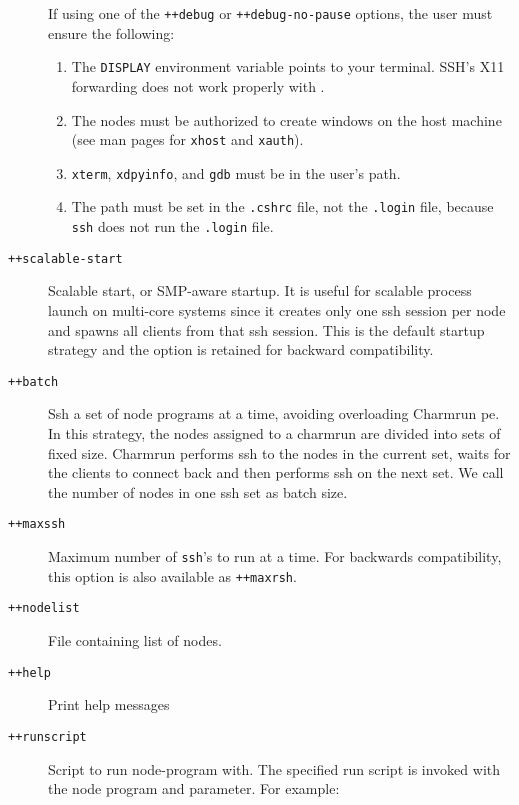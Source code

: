 \begin{description}
If using one of the {\tt ++debug} or {\tt ++debug-no-pause} options,
the user must ensure the following:
\begin{enumerate}

\item The {\tt DISPLAY} environment variable points to your terminal.
SSH's X11 forwarding does not work properly with \charmpp{}.

\item The nodes must be authorized to create windows on the host machine (see
man pages for {\tt xhost} and {\tt xauth}).

\item {\tt xterm}, {\tt xdpyinfo},  and {\tt gdb} must be in
the user's path.

\item The path must be set in the {\tt .cshrc} file, not the {\tt .login}
file, because {\tt ssh} does not run the {\tt .login} file.

\end{enumerate}

\item[{\tt ++scalable-start}]   Scalable start, or SMP-aware startup. It is useful for scalable process launch on multi-core systems since it creates only one ssh session per node and spawns all clients from that ssh session. This is the default startup strategy and the option is retained for backward compatibility.

\item[{\tt ++batch}]            Ssh a set of node programs at a time, avoiding overloading Charmrun pe.  In this strategy, the nodes assigned to a charmrun are divided into sets of fixed size. Charmrun performs ssh to the nodes in the current set, waits for the clients to connect back and then performs ssh on the next set. We call the number of nodes in one ssh set as batch size.

\item[{\tt ++maxssh}] Maximum number of {\tt ssh}'s to run at a
time. For backwards compatibility, this option is also available as {\tt ++maxrsh}.

\item[{\tt ++nodelist}] File containing list of nodes.

\item[{\tt ++help}]             Print help messages

\item[{\tt ++runscript}]        Script to run node-program with. The specified run script is invoked with the node program and parameter. For example:


\end{description}
